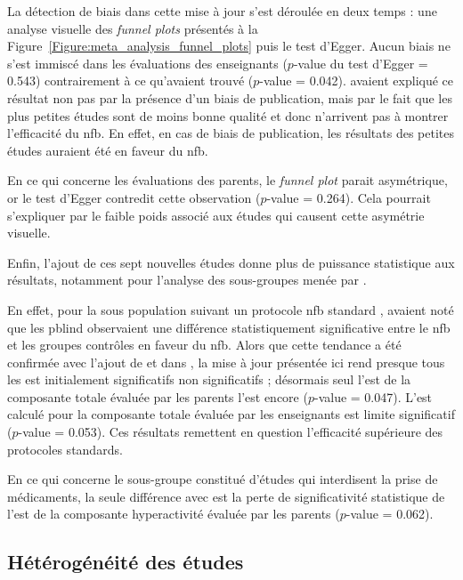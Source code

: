 La détection de biais dans cette mise à jour s'est déroulée en deux temps : une analyse visuelle des \textit{funnel plots} présentés à la Figure~\ref{Figure:meta_analysis_funnel_plots}
puis le test d'Egger. Aucun biais ne s'est immiscé dans les évaluations des enseignants ($p$-value du test d'Egger = 0.543) contrairement à ce qu'avaient trouvé \citet{Cortese2016} ($p$-value = 0.042). 
\citet{Cortese2016} avaient expliqué ce résultat non pas par la présence d'un biais de publication, mais par le fait que les plus petites études sont 
de moins bonne qualité et donc n'arrivent pas à montrer l'efficacité du \gls{nfb}. En effet, en cas de biais de publication, les résultats des petites
études auraient été en faveur du \gls{nfb}. 

En ce qui concerne les évaluations des parents, le \textit{funnel plot} parait asymétrique, or le test d'Egger contredit cette observation ($p$-value = 0.264). 
Cela pourrait s'expliquer par le faible poids associé aux études qui causent cette asymétrie visuelle. 

Enfin, l'ajout de ces sept nouvelles études donne plus de puissance statistique aux résultats, notamment pour l'analyse des sous-groupes menée par \citet{Cortese2016}.

En effet, pour la sous population suivant un protocole \gls{nfb} standard \citep{Arns2014}, \citet{Cortese2016} avaient noté que les \gls{pblind} observaient
une différence statistiquement significative entre le \gls{nfb} et les groupes contrôles en faveur du \gls{nfb}. Alors que cette tendance a été confirmée avec l'ajout 
de \citet{Baumeister2016} et \citet{Strehl2017} dans \citet{Bussalb2019clinical}, la mise à jour présentée ici rend presque tous les \gls{est} initialement significatifs 
non significatifs ; désormais seul l'\gls{est} de la composante totale évaluée par les parents l'est encore ($p$-value = 0.047). 
L'\gls{est} calculé pour la composante totale évaluée par les enseignants est limite significatif ($p$-value = 0.053). Ces résultats remettent en question l'efficacité
supérieure des protocoles standards.

En ce qui concerne le sous-groupe constitué d'études qui interdisent la prise de médicaments, la seule différence avec \citep{Cortese2016} est la perte de   
significativité statistique de l'\gls{est} de la composante hyperactivité évaluée par les parents ($p$-value = 0.062).

\subsection{Hétérogénéité des études} 


